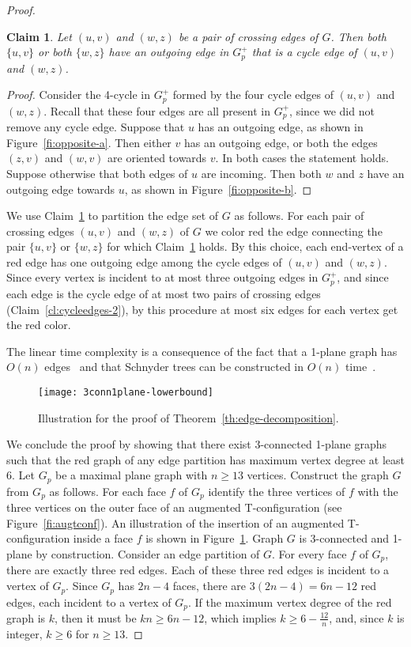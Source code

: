 \documentclass{article}
\newtheorem{claim}{Claim}
\begin{document}
\begin{proof}
\begin{claim}\label{cl:opposite}
Let $(u,v)$ and $(w,z)$ be a pair of crossing edges of $G$. Then both $\{u,v\}$ or both $\{w,z\}$ have an outgoing edge in $G_p^+$ that is a cycle edge of $(u,v)$ and $(w,z)$.
\end{claim}
\begin{proof}
Consider the 4-cycle in $G_p^+$ formed by the four cycle edges of $(u,v)$ and $(w,z)$. Recall that these four edges are all present in $G_p^+$, since we did not remove any cycle edge. Suppose that $u$ has an outgoing edge, as shown in Figure~\ref{fi:opposite-a}. Then either $v$ has an outgoing edge, or both the edges $(z,v)$ and $(w,v)$ are oriented towards $v$. In both cases the statement holds. Suppose otherwise that both edges of $u$ are incoming. Then both $w$ and $z$ have an outgoing edge towards $u$, as shown in Figure~\ref{fi:opposite-b}.
\end{proof}

We use Claim~\ref{cl:opposite} to partition the edge set of $G$ as follows. For each pair of crossing edges $(u,v)$ and $(w,z)$ of $G$ we color red the edge connecting the pair $\{u,v\}$ or $\{w,z\}$ for which Claim~\ref{cl:opposite} holds. By this choice, each end-vertex of a red edge has one outgoing edge among the cycle edges of $(u,v)$ and $(w,z)$. Since every vertex is incident to at most three outgoing edges in $G_p^+$, and since each edge is the cycle edge of at most two pairs of crossing edges (Claim~\ref{cl:cycleedges-2}), by this procedure at most six edges for each vertex get the red color. 

The linear time complexity is a consequence of the fact that a 1-plane graph has $O(n)$ edges~\cite{Suzuki2010} and that Schnyder trees can be constructed in $O(n)$ time~\cite{DBLP:conf/soda/Schnyder90}.


\begin{figure}[t]
    \centering
    \texttt{[image: 3conn1plane-lowerbound]}
    \caption{Illustration for the proof of Theorem~\ref{th:edge-decomposition}.}\label{fi:3connlb-1}
\end{figure}

We conclude the proof by showing that there exist 3-connected 1-plane graphs such that the red graph of any edge partition has maximum vertex degree at least $6$.
Let $G_p$ be a maximal plane graph with $n \geq 13$ vertices. Construct the graph $G$ from $G_p$ as follows. For each face $f$ of $G_p$ identify the three vertices of $f$ with the three vertices on the outer face of an augmented T-configuration (see Figure~\ref{fi:augtconf}). An illustration of the insertion of an augmented T-configuration inside a face $f$ is shown in Figure~\ref{fi:3connlb-1}. Graph $G$ is 3-connected and 1-plane by construction. Consider an edge partition of $G$. For every face $f$ of $G_p$, there are exactly three red edges. Each of these three red edges is incident to a vertex of $G_p$. Since $G_p$ has $2n-4$ faces, there are $3(2n-4)=6n-12$ red edges, each incident to a vertex of $G_p$. If the maximum vertex degree of the red graph is $k$, then it must be $kn \geq 6n - 12$, which implies $k \geq  6 - \frac{12}{n}$, and, since $k$ is integer, $k \geq 6$ for $n \geq 13$.
\end{proof}
\end{document}
